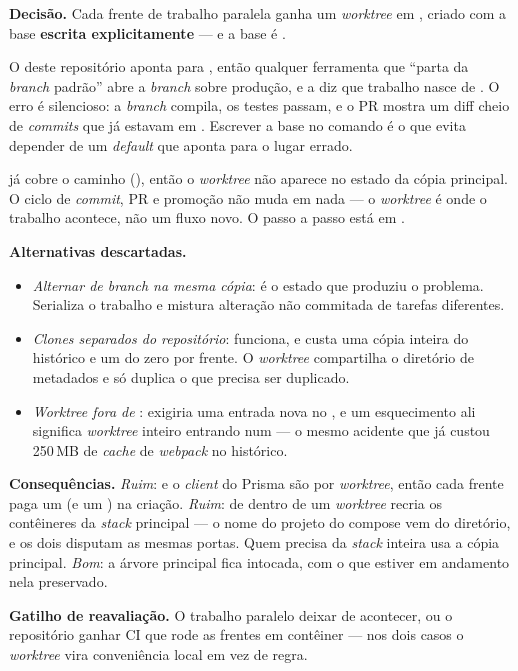 \textbf{Decisão.} Cada frente de trabalho paralela ganha um \emph{worktree} em
, criado com a base \textbf{escrita
explicitamente} --- e a base é .

O  deste repositório aponta para , então
qualquer ferramenta que \enquote{parta da \emph{branch} padrão} abre a
\emph{branch} sobre produção, e a  diz que trabalho nasce de
. O erro é silencioso: a \emph{branch} compila, os testes passam, e o
PR mostra um diff cheio de \emph{commits} que já estavam em . Escrever
a base no comando é o que evita depender de um \emph{default} que aponta para
o lugar errado.

 já cobre o caminho (), então o \emph{worktree}
não aparece no estado da cópia principal. O ciclo de \emph{commit}, PR e
promoção não muda em nada --- o \emph{worktree} é onde o trabalho acontece, não
um fluxo novo. O passo a passo está em .

\textbf{Alternativas descartadas.}
\begin{itemize}
  \item \emph{Alternar de \emph{branch} na mesma cópia}: é o estado que
    produziu o problema. Serializa o trabalho e mistura alteração não
    commitada de tarefas diferentes.
  \item \emph{Clones separados do repositório}: funciona, e custa uma cópia
    inteira do histórico e um  do zero por frente. O
    \emph{worktree} compartilha o diretório de metadados e só duplica o que
    precisa ser duplicado.
  \item \emph{\emph{Worktree} fora de }: exigiria uma entrada
    nova no , e um esquecimento ali significa \emph{worktree}
    inteiro entrando num  --- o mesmo acidente que já custou 250\,MB
    de \emph{cache} de \emph{webpack} no histórico.
\end{itemize}

\textbf{Consequências.} \emph{Ruim}:  e o \emph{client} do
Prisma são por \emph{worktree}, então cada frente paga um  (e
um ) na criação. \emph{Ruim}:  de
dentro de um \emph{worktree} recria os contêineres da \emph{stack} principal
--- o nome do projeto do compose vem do diretório, e os dois disputam as mesmas
portas. Quem precisa da \emph{stack} inteira usa a cópia principal.
\emph{Bom}: a árvore principal fica intocada, com o que estiver em andamento
nela preservado.

\textbf{Gatilho de reavaliação.} O trabalho paralelo deixar de acontecer, ou o
repositório ganhar CI que rode as frentes em contêiner --- nos dois casos o
\emph{worktree} vira conveniência local em vez de regra.
